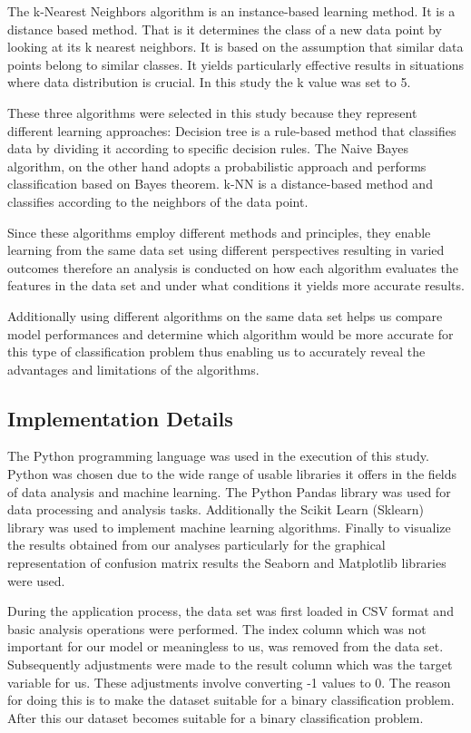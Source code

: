 \documentclass[conference]{IEEEtran}
\begin{document}
    The k-Nearest Neighbors algorithm is an instance-based learning method. It is a distance based method. That is it determines the class of a new data point by looking at its k nearest neighbors. It is based on the assumption that similar data points belong to similar classes. It yields particularly effective results in situations where data distribution is crucial. In this study the k value was set to 5.

    These three algorithms were selected in this study because they represent different learning approaches: Decision tree is a rule-based method that classifies data by dividing it according to specific decision rules. The Naive Bayes algorithm, on the other hand adopts a probabilistic approach and performs classification based on Bayes theorem. k-NN is a distance-based method and classifies according to the neighbors of the data point.

    Since these algorithms employ different methods and principles, they enable learning from the same data set using different perspectives resulting in varied outcomes therefore an analysis is conducted on how each algorithm evaluates the features in the data set and under what conditions it yields more accurate results.

    Additionally using different algorithms on the same data set helps us compare model performances and determine which algorithm would be more accurate for this type of classification problem thus enabling us to accurately reveal the advantages and limitations of the algorithms.

	
	\subsection{Implementation Details}

    The Python programming language was used in the execution of this study. Python was chosen due to the wide range of usable libraries it offers in the fields of data analysis and machine learning. The Python Pandas library was used for data processing and analysis tasks. Additionally the Scikit Learn (Sklearn) library was used to implement machine learning algorithms. Finally to visualize the results obtained from our analyses particularly for the graphical representation of confusion matrix results the Seaborn and Matplotlib libraries were used.

    During the application process, the data set was first loaded in CSV format and basic analysis operations were performed. The index column which was not important for our model or meaningless to us, was removed from the data set. Subsequently adjustments were made to the result column which was the target variable for us. These adjustments involve converting -1 values to 0.  The reason for doing this is to make the dataset suitable for a binary classification problem.  After this our dataset becomes suitable for a binary classification problem.
\end{document}
